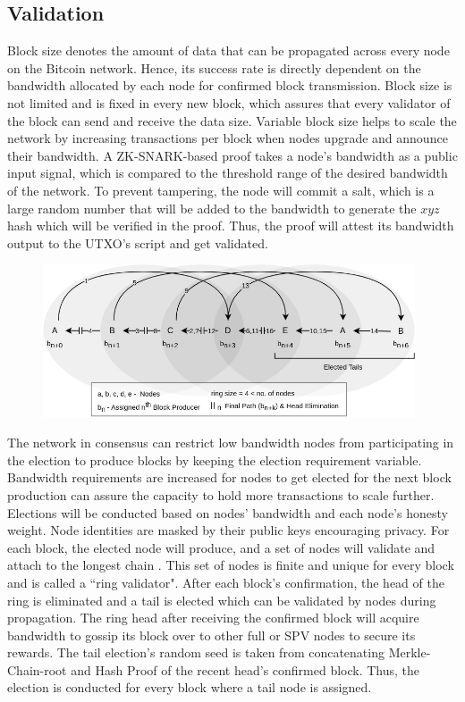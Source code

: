 \documentclass[a4paper, 10pt]{extarticle}
\begin{document}
\subsection{Validation}
Block size denotes the amount of data that can be propagated across every node on the Bitcoin network. Hence, its success rate is directly dependent on the bandwidth allocated by each node for confirmed block transmission. Block size is not limited and is fixed in every new block, which assures that every validator of the block can send and receive the data size. Variable block size helps to scale the network by increasing transactions per block when nodes upgrade and announce their bandwidth. A ZK-SNARK-based proof takes a node’s bandwidth as a public input signal, which is compared to the threshold range of the desired bandwidth of the network. To prevent tampering, the node will commit a salt, which is a large random number that will be added to the bandwidth to generate the $xyz$ hash which will be verified in the proof. Thus, the proof will attest its bandwidth output to the UTXO’s script and get validated.
\begin{figure}[H]
\begin{center}
\includegraphics[width=11cm]{ring}
\end{center}
\end{figure}
The network in consensus can restrict low bandwidth nodes from participating in the election to produce blocks by keeping the election requirement variable. Bandwidth requirements are increased for nodes to get elected for the next block production can assure the capacity to hold more transactions to scale further. Elections will be conducted based on nodes' bandwidth and each node's honesty weight. Node identities are masked by their public keys encouraging privacy. For each block, the elected node will produce, and a set of nodes will validate and attach to the longest chain \cite{nakamoto2008bitcoin}. This set of nodes is finite and unique for every block and is called a ``ring validator". After each block's confirmation, the head of the ring is eliminated and a tail is elected which can be validated by nodes during propagation. The ring head after receiving the confirmed block will acquire bandwidth to gossip its block over to other full or SPV nodes to secure its rewards. The tail election's random seed is taken from concatenating Merkle-Chain-root and Hash Proof \cite{yakovenko2018solana} of the recent head's confirmed block. Thus, the election is conducted for every block where a tail node is assigned.
\end{document}
